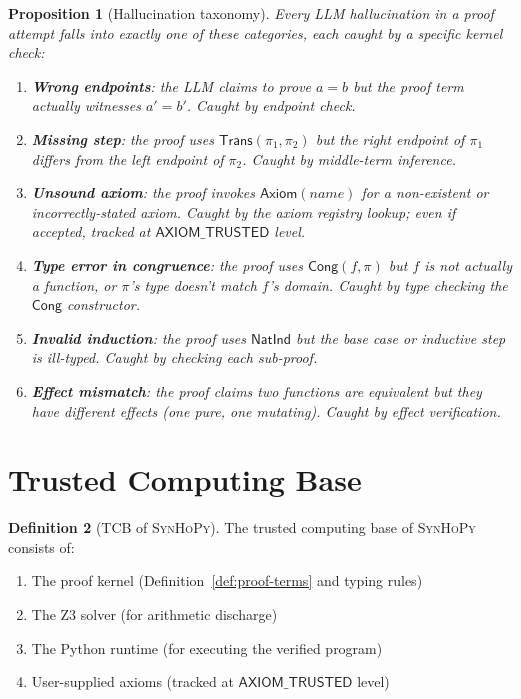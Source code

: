 \documentclass[11pt,a4paper]{report}
\theoremstyle{definition}
\newtheorem{definition}{Definition}[chapter]
\theoremstyle{plain}
\newtheorem{proposition}[definition]{Proposition}
\newcommand{\Trans}{\mathsf{Trans}}
\newcommand{\Cong}{\mathsf{Cong}}
\newcommand{\synhopy}{\textsc{SynHoPy}}
\begin{document}
\begin{proposition}[Hallucination taxonomy]
\label{prop:hallucination-taxonomy}
Every LLM hallucination in a proof attempt falls into exactly one of these
categories, each caught by a specific kernel check:

\begin{enumerate}
  \item \textbf{Wrong endpoints}: the LLM claims to prove $a = b$ but the
    proof term actually witnesses $a' = b'$.  Caught by endpoint check.
  \item \textbf{Missing step}: the proof uses $\Trans(\pi_1, \pi_2)$ but the
    right endpoint of $\pi_1$ differs from the left endpoint of $\pi_2$.
    Caught by middle-term inference.
  \item \textbf{Unsound axiom}: the proof invokes $\mathsf{Axiom}(\mathit{name})$
    for a non-existent or incorrectly-stated axiom.  Caught by the axiom
    registry lookup; even if accepted, tracked at $\mathsf{AXIOM\_TRUSTED}$ level.
  \item \textbf{Type error in congruence}: the proof uses $\Cong(f, \pi)$ but
    $f$ is not actually a function, or $\pi$'s type doesn't match $f$'s domain.
    Caught by type checking the $\Cong$ constructor.
  \item \textbf{Invalid induction}: the proof uses $\mathsf{NatInd}$ but the
    base case or inductive step is ill-typed.  Caught by checking each sub-proof.
  \item \textbf{Effect mismatch}: the proof claims two functions are equivalent
    but they have different effects (one pure, one mutating).  Caught by effect
    verification.
\end{enumerate}
\end{proposition}

\section{Trusted Computing Base}

\begin{definition}[TCB of \synhopy{}]
The trusted computing base of \synhopy{} consists of:
\begin{enumerate}
  \item The proof kernel (Definition~\ref{def:proof-terms} and typing rules)
  \item The Z3 solver (for arithmetic discharge)
  \item The Python runtime (for executing the verified program)
  \item User-supplied axioms (tracked at $\mathsf{AXIOM\_TRUSTED}$ level)
\end{enumerate}
\end{definition}
\end{document}
